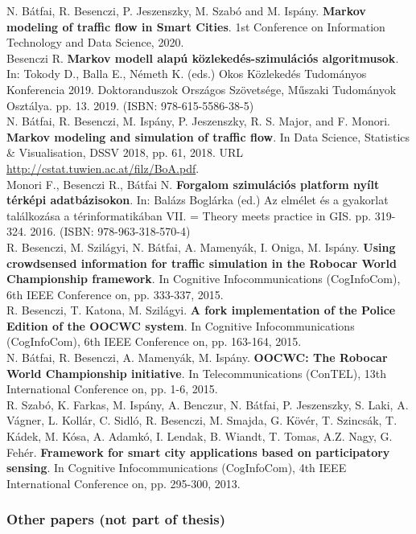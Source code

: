 \documentclass[b5paper,12pt]{report}
\theoremstyle{definition}
\begin{document}
\begin{singlespace}
\noindent
N. Bátfai, R. Besenczi, P. Jeszenszky, M. Szabó and M. Ispány. {\bf{Markov modeling of traffic flow in Smart Cities}}. 1st Conference on Information Technology and Data Science, 2020.
\\[10pt]
\noindent
Besenczi R. {\bf{Markov modell alapú közlekedés-szimulációs algoritmusok}}. In: Tokody D., Balla E., Németh K. (eds.) Okos Közlekedés Tudományos Konferencia 2019. Doktoranduszok Országos Szövetsége, Műszaki Tudományok Osztálya. pp. 13. 2019. (ISBN: 978-615-5586-38-5)
\\[10pt]
\noindent
N. Bátfai, R. Besenczi, M. Ispány, P. Jeszenszky, R. S. Major, and F. Monori. {\bf{Markov modeling and simulation of traffic flow}}. In Data Science, Statistics \& Visualisation, DSSV 2018, pp. 61, 2018. URL \url{http://cstat.tuwien.ac.at/filz/BoA.pdf}.
\\[10pt]
\noindent
Monori F., Besenczi R., Bátfai N. {\bf{Forgalom szimulációs platform nyílt térképi adatbázisokon}}. In: Balázs Boglárka (ed.) Az elmélet és a gyakorlat találkozása a térinformatikában VII. = Theory meets practice in GIS. pp. 319-324. 2016. (ISBN: 978-963-318-570-4)
\\[10pt]
\noindent
R. Besenczi, M. Szilágyi, N. Bátfai, A. Mamenyák, I. Oniga, M. Ispány. {\bf{Using crowdsensed information for traffic simulation in the Robocar World Championship framework}}. In Cognitive Infocommunications (CogInfoCom), 6th IEEE Conference on, pp. 333-337, 2015.
\\[10pt]
\noindent
R. Besenczi, T. Katona, M. Szilágyi. {\bf{A fork implementation of the Police Edition of the OOCWC system}}. In Cognitive Infocommunications (CogInfoCom), 6th IEEE Conference on, pp. 163-164, 2015.
\\[10pt]
\noindent
N. Bátfai, R. Besenczi, A. Mamenyák, M. Ispány. {\bf{OOCWC: The Robocar World Championship initiative}}. In Telecommunications (ConTEL), 13th International Conference on, pp. 1-6, 2015.
\\[10pt]
\noindent
R. Szabó, K. Farkas, M. Ispány, A. Benczur, N. Bátfai, P. Jeszenszky, S. Laki, A. Vágner, L. Kollár, C. Sidló, R. Besenczi, M. Smajda, G. Kövér, T. Szincsák, T. Kádek, M. Kósa, A. Adamkó, I. Lendak, B. Wiandt, T. Tomas, A.Z. Nagy, G. Fehér. {\bf{Framework for smart city applications based on participatory sensing}}. In Cognitive Infocommunications (CogInfoCom), 4th IEEE International Conference on, pp. 295-300, 2013.

\subsubsection*{Other papers (not part of thesis)}


\end{singlespace}
\end{document}
